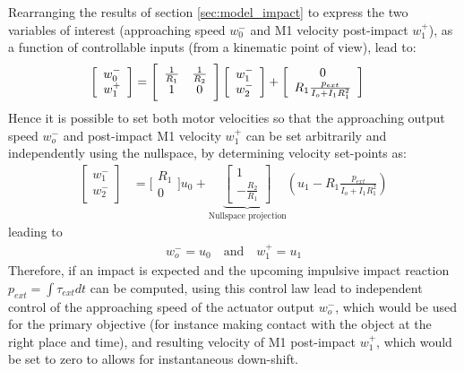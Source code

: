 Rearranging the results of section \ref{sec:model_impact} to express the two variables of interest (approaching speed $w_0^-$ and M1 velocity post-impact $w_1^+$), as a function of controllable inputs (from a kinematic point of view), lead to:
%
\begin{align}
\left[ \begin{array}{c} w_0^- \\ w_1^+ \end{array} \right] &= \Bigg[ \begin{array}{c c} \frac{1}{R_1} & \frac{1}{R_2}\\ 1 & 0 \end{array} \Bigg] \left[ \begin{array}{c} w_1^- \\ w_2^- \end{array} \right] + \left[ \begin{array}{c} 0 \\ R_1 \frac{  p_{ext}  }{I_o + I_1 R_1^2} \end{array} \right]
\label{eq:dsdm_impact_approx_sol}
\end{align}
%
Hence it is possible to set both motor velocities so that the approaching output speed $w_o^-$ and post-impact M1 velocity $w_1^+$ can be set arbitrarily and independently using the nullspace, by determining velocity set-points as:
%
\begin{align}
\left[ \begin{array}{c} w_1^- \\ w_2^- \end{array} \right] &= \Bigg[ \begin{array}{c} R_1 \\ 0  \end{array} \Bigg] u_0  + 
\underbrace{ \left[ \begin{array}{c} 1 \\ -\frac{R_2}{R_1} \end{array} \right]}_{\text{Nullspace projection}}
 \left( u_1 - R_1 \frac{ p_{ext} }{I_o + I_1 R_1^2} \right) 
\end{align}
%
leading to
%
\begin{align}
 w_o^- = u_0 \quad \text{and} \quad w_1^+ = u_1
\end{align}
%
Therefore, if an impact is expected and the upcoming impulsive impact reaction $p_{ext} = \int{\tau_{ext} dt}$ can be computed, using this control law lead to independent control of the approaching speed of the actuator output $w_o^-$, which would be used for the primary objective (for instance making contact with the object at the right place and time), and resulting velocity of M1 post-impact $w_1^+$, which would be set to zero to allows for instantaneous down-shift.

